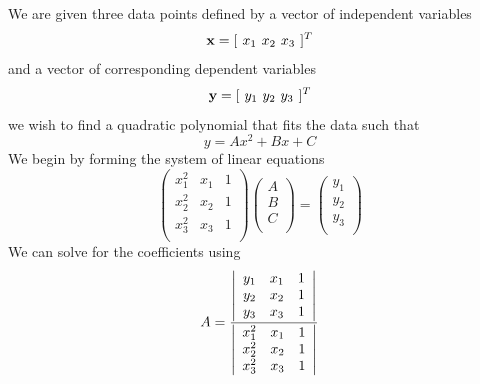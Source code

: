 We are given three data points defined by a vector of independent
variables
%
\begin{equation}
     \mathbf{x} = [\hspace{.05 in} x_1 \hspace{.05 in} x_2 \hspace{.05 in}
     x_3 \hspace{.05
     in}]^T
\end{equation}
%
and a vector of corresponding dependent variables
%
\begin{equation}
     \mathbf{y} = [\hspace{.05 in} y_1 \hspace{.05 in} y_2 \hspace{.05 in}
     y_3  \hspace{.05
     in}]^T
\end{equation}
%
we wish to find a quadratic polynomial that fits the data such
that
%
\begin{equation}
   y = Ax^2 + Bx +C
\end{equation}
%
We begin by forming the system of linear equations
%
\begin{equation}
    \left(%
    \begin{array}{ccc}
       x_1^2 & x_1 & 1 \\
       x_2^2 & x_2 & 1 \\
       x_3^2 & x_3 & 1 \\
    \end{array}%
    \right)
     \left(%
    \begin{array}{ccc}
       A \\
       B \\
       C \\
    \end{array}%
    \right)
    =
     \left(%
    \begin{array}{ccc}
       y_1 \\
       y_2 \\
       y_3 \\
    \end{array}%
    \right)
\end{equation}
%
We can solve for the coefficients using
%
\begin{equation}
    A = \frac{
    \left|%
    \begin{array}{ccc}
       y_1 & x_1 & 1 \\
       y_2 & x_2 & 1 \\
       y_3 & x_3 & 1 \\
    \end{array}%
    \right|
    }
    {    \left|%
    \begin{array}{ccc}
       x_1^2 & x_1 & 1 \\
       x_2^2 & x_2 & 1 \\
       x_3^2 & x_3 & 1 \\
    \end{array}%
    \right|}
\end{equation}
